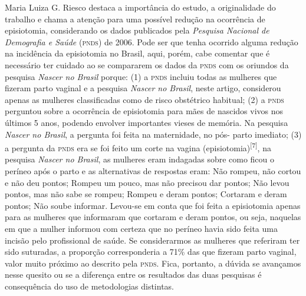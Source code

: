 \documentclass{article}
\begin{document}
Maria Luiza G. Riesco destaca a importância do estudo, a originalidade do
trabalho e
chama a atenção para uma possível redução na ocorrência de episiotomia,
considerando os
dados publicados pela \textit{Pesquisa Nacional de Demografia e Saúde}
(\textsc{pnds}) de
2006. Pode ser que tenha ocorrido alguma redução na incidência da episiotomia no
Brasil,
aqui, porém, cabe comentar que é necessário ter cuidado ao se compararem os
dados da
\textsc{pnds} com os oriundos da pesquisa \textit{Nascer no Brasil}
porque: (1) a \textsc{pnds}
incluiu todas as mulheres que fizeram parto vaginal e a pesquisa \textit{Nascer
no
Brasil}, neste artigo, considerou apenas as mulheres classificadas como de
risco obstétrico habitual; (2) a \textsc{pnds} perguntou sobre a ocorrência de
episiotomia para
mães de nascidos vivos nos últimos 5 anos, podendo envolver importantes vieses
de
memória. Na pesquisa \textit{Nascer no Brasil}, a pergunta foi feita na
maternidade, no pós- parto imediato; (3) a pergunta da \textsc{pnds} era se foi feito um
corte na
vagina (episiotomia)\textsuperscript{[}\textsuperscript{7}\textsuperscript{]}, na pesquisa
\textit{Nascer no Brasil}, as mulheres eram indagadas sobre como ficou o
períneo após o parto e as alternativas de respostas eram: Não rompeu, não cortou
e não
deu pontos; Rompeu um pouco, mas não precisou dar pontos; Não levou pontos, mas
não sabe
se rompeu; Rompeu e deram pontos; Cortaram e deram pontos; Não soube informar.
Levou-se
em conta que foi feita a episiotomia apenas para as mulheres que informaram que
cortaram
e deram pontos, ou seja, naquelas em que a mulher informou com certeza que no
períneo
havia sido feita uma incisão pelo profissional de saúde. Se considerarmos as
mulheres
que referiram ter sido suturadas, a proporção corresponderia a 71\% das que
fizeram parto
vaginal, valor muito próximo ao descrito pela \textsc{pnds}. Fica, portanto, a dúvida se
avançamos nesse quesito ou se a diferença entre os resultados das duas pesquisas
é
consequência do uso de metodologias distintas.
\end{document}
